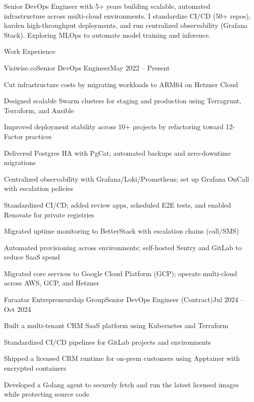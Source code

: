 \documentclass[]{main}
\begin{document}
\resumeheader
{\address{Leipzig, Germany}}
{}
{}
{}
{}
{}

Senior DevOps Engineer with 5+ years building scalable, automated infrastructure across multi-cloud environments. I standardize CI/CD (50+ repos), harden high-throughput deployments, and run centralized observability (Grafana Stack). Exploring MLOps to automate model training and inference.

\begin{section}{Work Experience}
 \begin{subsection}{Visiwise.co}{Senior DevOps Engineer}{May 2022 -- Present}{}
     \item Cut infrastructure costs by migrating workloads to ARM64 on Hetzner Cloud
     \item Designed scalable Swarm clusters for staging and production using Terragrunt, Terraform, and Ansible
     \item Improved deployment stability across 10+ projects by refactoring toward 12-Factor practices
     \item Delivered Postgres HA with PgCat; automated backups and zero-downtime migrations
     \item Centralized observability with Grafana/Loki/Prometheus; set up Grafana OnCall with escalation policies
     \item Standardized CI/CD; added review apps, scheduled E2E tests, and enabled Renovate for private registries
     \item Migrated uptime monitoring to BetterStack with escalation chains (call/SMS)
     \item Automated provisioning across environments; self-hosted Sentry and GitLab to reduce SaaS spend
     \item Migrated core services to Google Cloud Platform (GCP); operate multi-cloud across AWS, GCP, and Hetzner
 \end{subsection}

 \begin{subsection}{Faraatar Entrepreneurship Group}{Senior DevOps Engineer (Contract)}{Jul 2024 -- Oct 2024}{}
     \item Built a multi-tenant CRM SaaS platform using Kubernetes and Terraform
     \item Standardized CI/CD pipelines for GitLab projects and environments
     \item Shipped a licensed CRM runtime for on-prem customers using Apptainer with encrypted containers
     \item Developed a Golang agent to securely fetch and run the latest licensed images while protecting source code
 \end{subsection}


\end{section}
\end{document}
